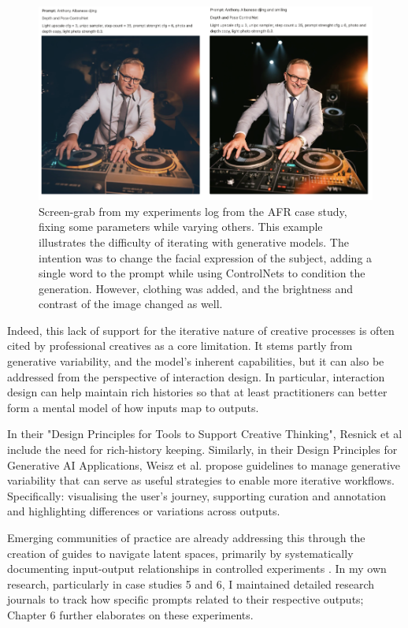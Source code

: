 \begin{figure}[H]
    \centering
    \includegraphics[width=1\linewidth]{alboexperiments.png}
    \caption{Screen-grab from my experiments log from the AFR case study, fixing some parameters while varying others. This example illustrates the difficulty of iterating with generative models. The intention was to change the facial expression of the subject, adding a single word to the prompt while using ControlNets to condition the generation. However, clothing was added, and the brightness and contrast of the image changed as well.}
    \label{fig:albo_series}
\end{figure}

Indeed, this lack of support for the iterative nature of creative processes is often cited by professional creatives as a core limitation. It stems partly from generative variability, and the model's inherent capabilities, but it can also be addressed from the perspective of interaction design. In particular, interaction design can help maintain rich histories so that at least practitioners can better form a mental model of how inputs map to outputs. 

In their "Design Principles for Tools to Support Creative Thinking", Resnick et al \cite{Resnick2005-fs} include the need for rich-history keeping. Similarly, in their Design Principles for Generative AI Applications, Weisz et al. \cite{Weisz2024-io} propose guidelines to manage generative variability that can serve as useful strategies to enable more iterative workflows. Specifically: visualising the user's journey, supporting curation and annotation and highlighting differences or variations across outputs.

Emerging communities of practice are already addressing this through the creation of guides to navigate latent spaces, primarily by systematically documenting input-output relationships in controlled experiments \cite{Smith2022-dm}. In my own research, particularly in case studies 5 and 6, I maintained detailed research journals to track how specific prompts related to their respective outputs; Chapter 6 further elaborates on these experiments.

